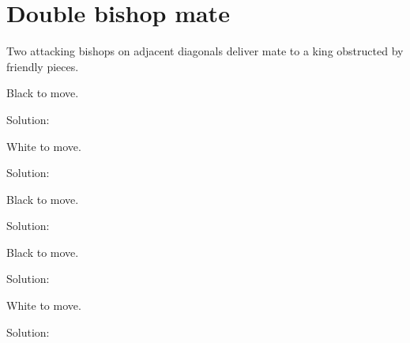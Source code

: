 \documentclass{book}
\begin{document}
\section{Double bishop mate}
Two attacking bishops on adjacent diagonals deliver mate to a king obstructed by friendly pieces.\begin{multicols}{2} 
\begin{samepage} 
\newgame 


 
\showboard
 
 Black to move. 
 
Solution: 
 
\end{samepage}\begin{samepage} 
\newgame 


 
\showboard
 
 White to move. 
 
Solution: 
 
\end{samepage}\begin{samepage} 
\newgame 


 
\showboard
 
 Black to move. 
 
Solution: 
 
\end{samepage}\begin{samepage} 
\newgame 


 
\showboard
 
 Black to move. 
 
Solution: 
 
\end{samepage}\begin{samepage} 
\newgame 


 
\showboard
 
 White to move. 
 
Solution: 
 
\end{samepage}\end{multicols} 
\newpage 
\end{document}
